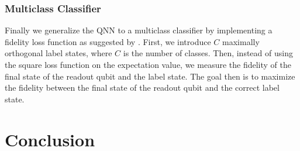 \documentclass[a4paper,10pt]{article}
\begin{document}
\subsubsection{Multiclass Classifier}
Finally we generalize the QNN to a multiclass classifier by implementing a fidelity loss function as suggested by \cite{perez2019data}.
First, we introduce $C$ maximally orthogonal label states, where $C$ is the number of classes.
Then, instead of using the square loss function on the expectation value, we measure the fidelity of the final state of the readout qubit and the label state.
The goal then is to maximize the fidelity between the final state of the readout qubit and the correct label state.

\section{Conclusion} \label{sec:conclusion}

\clearpage

\printbibliography[heading=bibintoc]
\end{document}
